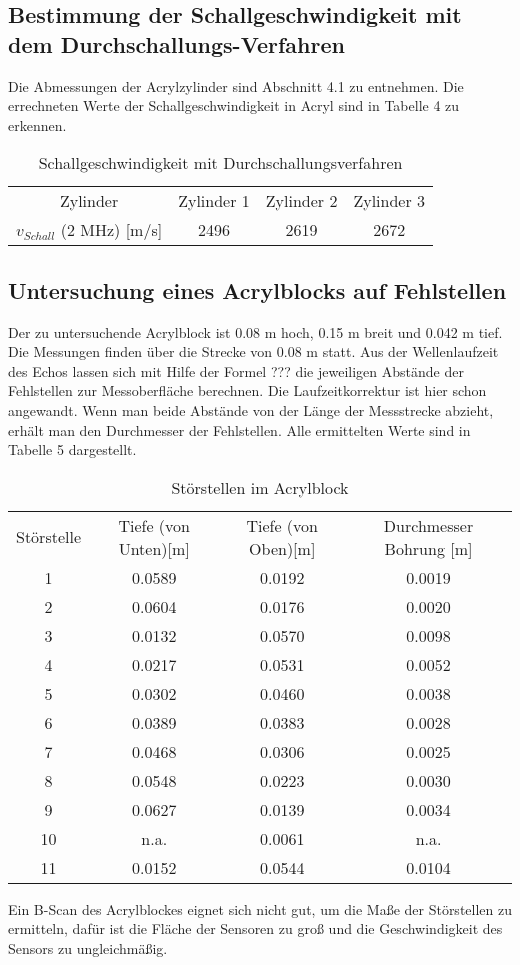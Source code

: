 \documentclass[11pt,ngerman,a4paper]{article}
\begin{document}
\subsection{Bestimmung der Schallgeschwindigkeit mit dem Durchschallungs-Verfahren}

Die Abmessungen der Acrylzylinder sind Abschnitt 4.1 zu entnehmen. Die errechneten Werte der Schallgeschwindigkeit in Acryl sind in Tabelle 4 zu erkennen.
\begin{table}[h]
\centering
 \begin{tabular}{|c||c|c|c|}
 Zylinder & Zylinder 1 & Zylinder 2 & Zylinder 3 \\
 $v_{Schall}$ (2 MHz) [m/s] & 2496 & 2619 & 2672 \\
 \end{tabular}
\caption{Schallgeschwindigkeit mit Durchschallungsverfahren}
\end{table}
\subsection{Untersuchung eines Acrylblocks auf Fehlstellen}
Der zu untersuchende Acrylblock ist 0.08 m hoch, 0.15 m breit und 0.042 m tief. Die Messungen finden über die Strecke von 0.08 m statt. Aus der Wellenlaufzeit des Echos lassen sich mit Hilfe der Formel ??? die jeweiligen Abstände der Fehlstellen zur Messoberfläche berechnen. Die Laufzeitkorrektur ist hier schon angewandt. Wenn man beide Abstände von der Länge der Messstrecke abzieht, erhält man den Durchmesser der Fehlstellen.  Alle ermittelten Werte sind in Tabelle 5 dargestellt.
\begin{table}[h]
\centering
 \begin{tabular}{|c||c|c|c|}
Störstelle  & Tiefe (von Unten)[m] & Tiefe (von Oben)[m]& Durchmesser Bohrung [m] \\
1 & 0.0589 & 0.0192 & 0.0019 \\
2 & 0.0604 & 0.0176 & 0.0020 \\
3 & 0.0132 & 0.0570 & 0.0098 \\
4 & 0.0217 & 0.0531 & 0.0052 \\
5 & 0.0302 & 0.0460 & 0.0038 \\
6 & 0.0389 & 0.0383 & 0.0028 \\
7 & 0.0468 & 0.0306 & 0.0025 \\
8 & 0.0548 & 0.0223 & 0.0030 \\
9 & 0.0627 & 0.0139 & 0.0034 \\
10 & n.a. & 0.0061 & n.a. \\
11 & 0.0152 & 0.0544 & 0.0104 \\
 \end{tabular}
\caption{Störstellen im Acrylblock}
\end{table}
Ein B-Scan des Acrylblockes eignet sich nicht gut, um die Maße der Störstellen zu ermitteln, dafür ist die Fläche der Sensoren zu groß und die Geschwindigkeit des Sensors zu ungleichmäßig.
\end{document}
